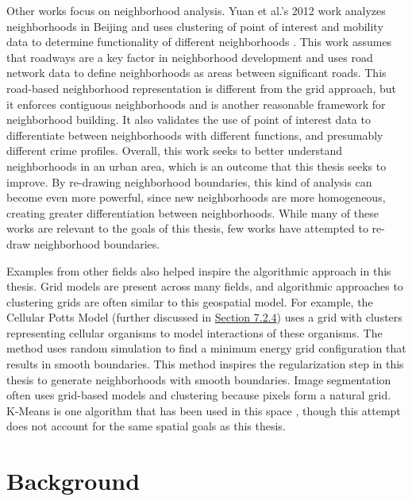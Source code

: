 \documentclass[times new roman,12pt]{article}
\begin{document}
Other works focus on neighborhood analysis. Yuan et al.'s 2012 work analyzes neighborhoods in Beijing and uses clustering of point of interest and mobility data to determine functionality of different neighborhoods \cite{yuan_discovering_2012}. This work assumes that roadways are a key factor in neighborhood development and uses road network data to define neighborhoods as areas between significant roads. This road-based neighborhood representation is different from the grid approach, but it enforces contiguous neighborhoods and is another reasonable framework for neighborhood building. It also validates the use of point of interest data to differentiate between neighborhoods with different functions, and presumably different crime profiles. Overall, this work seeks to better understand neighborhoods in an urban area, which is an outcome that this thesis seeks to improve. By re-drawing neighborhood boundaries, this kind of analysis can become even more powerful, since new neighborhoods are more homogeneous, creating greater differentiation between neighborhoods. While many of these works are relevant to the goals of this thesis, few works have attempted to re-draw neighborhood boundaries.

Examples from other fields also helped inspire the algorithmic approach in this thesis. Grid models are present across many fields, and algorithmic approaches to clustering grids are often similar to this geospatial model. For example, the Cellular Potts Model \cite{graner1992simulation} (further discussed in \hyperref[cpm]{Section 7.2.4}) uses a grid with clusters representing cellular organisms to model interactions of these organisms. The method uses random simulation to find a minimum energy grid configuration that results in smooth boundaries. This method inspires the regularization step in this thesis to generate neighborhoods with smooth boundaries. Image segmentation often uses grid-based models and clustering because pixels form a natural grid. K-Means is one algorithm that has been used in this space \cite{dhanachandra2015image}, though this attempt does not account for the same spatial goals as this thesis. 





\newpage

\section{Background}
\end{document}

